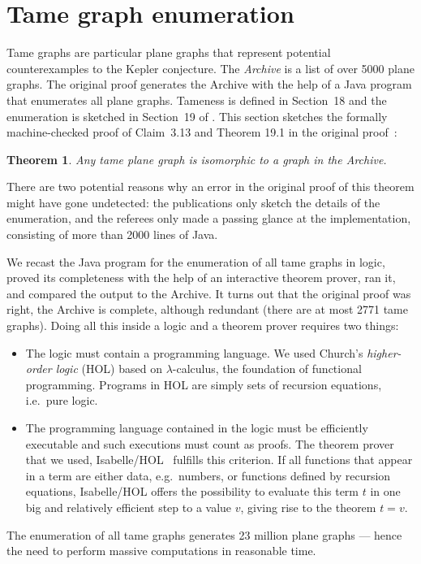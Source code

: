 \documentclass[11pt]{amsart}
\newtheorem{thm}{Theorem}
\begin{document}
\section{Tame graph enumeration}

\label{sec:graph}

Tame graphs are particular plane graphs that represent potential
counterexamples to the Kepler conjecture. The \emph{Archive} is a list of over 5000 plane
graphs.  The original proof generates the Archive with the help of a Java program that
enumerates all plane graphs. Tameness is defined
in Section~18 and the enumeration is sketched in Section~19 of
\cite{Hales:2006:DCG}.
This section sketches the formally machine-checked proof of Claim~3.13 and
Theorem 19.1 in the original proof~\cite{Hales:2006:DCG}:
\begin{thm}\label{Archive:complete}
Any tame plane graph is isomorphic to a graph in the Archive.
\end{thm}
There are two potential reasons why an error in the original proof of this theorem might have gone undetected:
the publications only sketch the details of the enumeration, and the
referees only made a passing glance at the implementation, consisting of more than 2000
lines of Java.

 

We recast the Java program for the enumeration of all tame graphs in
logic, proved its completeness with the help of an interactive theorem prover,
ran it, and compared the output to the
Archive.  It turns out that the original proof was right, the Archive is complete,
although redundant (there are at most 2771 tame graphs).
Doing all this inside a logic and a theorem prover requires two things:
\begin{itemize}
\item The logic must contain a programming language.
We used Church's \emph{higher-order logic} (HOL) based on $\lambda$-calculus,
the foundation of functional programming. Programs in HOL are simply
sets of recursion equations, i.e.\ pure logic.
\item The programming language contained in the logic must be efficiently
executable and such executions must count as proofs. The theorem prover that we used, Isabelle/HOL~\cite{LNCS2283} fulfills this criterion. If all functions
that appear in a term are either data, e.g.\ numbers, or functions defined
by recursion equations, Isabelle/HOL offers the possibility to evaluate this term $t$ in one big and relatively efficient step to a value $v$, giving rise to the theorem $t = v$.
\end{itemize}
The enumeration of all tame graphs generates 23 million plane graphs ---
hence the need to perform massive computations in reasonable time.
\end{document}
